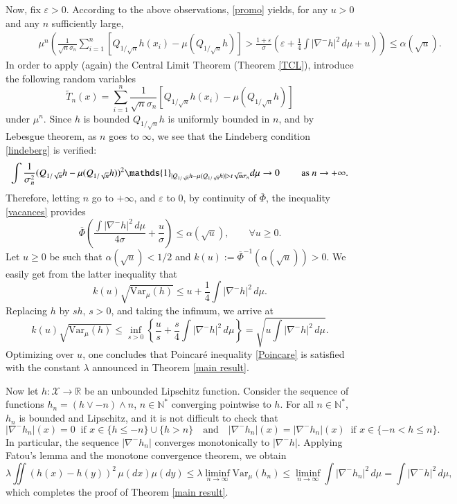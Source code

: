 \documentclass[11pt]{amsart}
\numberwithin{equation}{section}
\begin{document}
Now, fix $\varepsilon>0$. According to the above observations,  \eqref{promo} yields, for any $u>0$ and any $n$ sufficiently large,
\begin{eqnarray}\label{vacances}
\qquad \quad \mu^{n} \left( \frac{1}{\sqrt{n}\sigma_n}\sum_{i=1}^n \left[Q_{1/\sqrt{n}} h(x_i) -\mu (Q_{1/\sqrt{n}}h)\right] > \frac{1+\varepsilon}{\sigma}\left( \varepsilon + \frac{1}{4}\int |\nabla^- h|^2\,d\mu  +u \right)  \right)
\leq \alpha (\sqrt{u}).
\end{eqnarray}
In order to apply (again) the Central Limit Theorem (Theorem \ref{TCL}), introduce the following random variables 
\[
\widetilde T_n(x)=\sum_{i=1}^n \frac{1}{\sqrt{n}\sigma_n} \left[Q_{1/\sqrt{n}} h(x_i) -\mu (Q_{1/\sqrt{n}}h)\right]
\]
 under $\mu^n$. Since $h$ is bounded $Q_{1/\sqrt{n}} h$ is uniformly bounded in $n$, and by Lebesgue theorem, as $n$ goes to $\infty$, we see that the Lindeberg condition \eqref{lindeberg} is verified:\[
\int \frac1{\sigma_n^2}(Q_{1/\sqrt{n}} h-\mu(Q_{1/\sqrt{n}} h))^2{\mathds{1}}_{|Q_{1/\sqrt{n}} h-\mu(Q_{1/\sqrt{n}} h)|>t\sqrt n \sigma_n} d\mu \to0 \qquad \hbox{ as } n \to +\infty.
\]
Therefore, letting $n$ go to $+\infty$, and $\varepsilon$ to $0$, by continuity of $\overline \Phi$, the inequality \eqref{vacances} provides  
\[
\overline{\Phi} \left(\frac{\int  |\nabla^- h|^2\,d\mu}{4\sigma} + \frac{u}{\sigma}  \right ) \leq \alpha (\sqrt{u}), \qquad \forall u \geq 0.
\]
Let $u\geq 0$ be such that $\alpha (\sqrt{u}) < 1/2$ and $k(u) := \overline{\Phi}^{-1}(\alpha (\sqrt{u}))>0$. 
We easily get from the latter inequality that 
\[
k(u)\sqrt{\mathrm{Var}_\mu (h)} \leq u + \frac{1}{4}\int |\nabla^- h|^2\,d\mu. 
\]
Replacing $h$ by $s h$, $s >0$, and taking the infimum, we arrive at 
\[
k(u) \sqrt{\mathrm{Var}_\mu (h)} \leq \inf_{s>0}\left\{\frac{u}{s} +\frac{s}{4}  \int |\nabla^- h|^2\,d\mu \right\}=\sqrt{u \int  |\nabla^- h|^2\,d\mu}.
\]
Optimizing over $u$, one concludes that Poincar\'e inequality \eqref{Poincare} is satisfied with the constant $\lambda$ announced in Theorem \ref{main result}.

Now let $h:{\mathcal{X}}\to {\mathbb{R}}$ be an unbounded Lipschitz function. Consider the sequence of functions $h_n=(h\vee -n)\wedge n$, $n\in{\mathbb{N}}^*$ converging pointwise to $h$. For all $n\in{\mathbb{N}}^*$, $h_n$ is bounded and Lipschitz, and it is not difficult to check that 
\begin{equation}\label{eq:truncation}
|\nabla^-h_n|(x)= 0\ \text{ if }x\in\{h\leq -n\}\cup \{h>n\}\quad \text{and}\quad |\nabla^-h_n|(x)= |\nabla^-h_n|(x)\ \text{ if }x\in\{-n<h\leq n\}.
\end{equation}
In particular, the sequence $|\nabla^-h_n|$ converges monotonically to $|\nabla^-h|$. Applying Fatou's lemma and the monotone convergence theorem, we obtain
\[
\lambda\iint (h(x)-h(y))^2\,\mu(dx)\mu(dy)\leq \lambda\liminf_{n\to\infty}\mathrm{Var}_\mu(h_n)\leq \liminf_{n\to \infty}\int  |\nabla^-h_n|^2\,d\mu = \int  |\nabla^-h|^2\,d\mu, 
\]
which completes the proof of Theorem \ref{main result}.
\endproof
\end{document}
